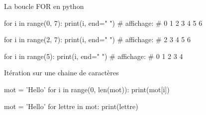 \def\level{Première}  %
\def\course{NSI}
\def\chaptername{Boucles FOR et WHILE} %
\def\docname{AP04-S}        %

\pagestyle{cours_FP}
\makeheader{} %



	\begin{easybox}{La boucle FOR en python}

				\begin{minipage}[b]{0.33\linewidth}
	\begin{CodePythontexAlt}[Largeur=1\linewidth,Centre,PremLigne=1,Lignes=false,]{}
for i in range(0, 7):
	print(i, end=" ")
# affichage: 
# 0 1 2 3 4 5 6
	
				\end{CodePythontexAlt}
		\end{minipage}\hfill
		\begin{minipage}[b]{0.33\linewidth}
	\begin{CodePythontexAlt}[Largeur=1\linewidth,Centre,PremLigne=1,Lignes=false,]{}
for i in range(2, 7):
	print(i, end=" ")
# affichage: 
# 2 3 4 5 6
					
				\end{CodePythontexAlt}
		\end{minipage}\hfill
		 \begin{minipage}[b]{0.33\linewidth}
	\begin{CodePythontexAlt}[Largeur=1\linewidth,Centre,PremLigne=1,Lignes=false,]{}
for i in range(5):
	print(i, end=" ")
# affichage: 
# 0 1 2 3 4
	
				\end{CodePythontexAlt}
		\end{minipage}
	\end{easybox}
	
	\begin{easybox}{Itération sur une chaine de caractères}{}
	
	\begin{minipage}{0.48\linewidth}
	\begin{CodePythontexAlt}[Largeur=1\linewidth,Centre,PremLigne=1]{}
	mot = 'Hello'
	for i in range(0, len(mot)):
		print(mot[i])
			
	\end{CodePythontexAlt}
	\end{minipage}\hfill
	\begin{minipage}{0.48\linewidth}
		\begin{CodePythontexAlt}[Largeur=1\linewidth,Centre,PremLigne=1]{}
	mot = 'Hello'
	for lettre in mot:
		print(lettre)	
		\end{CodePythontexAlt}
	
	
	\end{minipage}
	\end{easybox}
		
